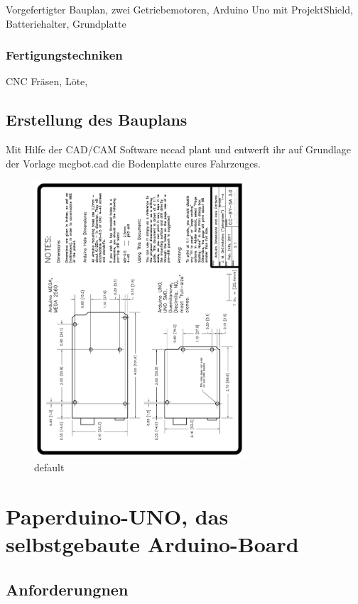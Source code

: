 Vorgefertigter Bauplan, zwei Getriebemotoren, Arduino Uno mit ProjektShield, Batteriehalter, 
Grundplatte  

\subsubsection{Fertigungstechniken}
CNC Fräsen, Löte, 


\subsection{Erstellung des Bauplans}

Mit Hilfe der CAD/CAM Software nccad plant und entwerft ihr auf Grundlage der Vorlage 
mcgbot.cad die Bodenplatte eures Fahrzeuges. 

\begin{figure}[htbp]
\begin{center}
\includegraphics[width=0.7\textwidth,angle=-90]{Kapitel4/Bilder/arduino_dimension}
\caption{default}
\label{default}
\end{center}
\end{figure}


\section{Paperduino-UNO, das selbstgebaute Arduino-Board}

\subsection{Anforderungnen}

